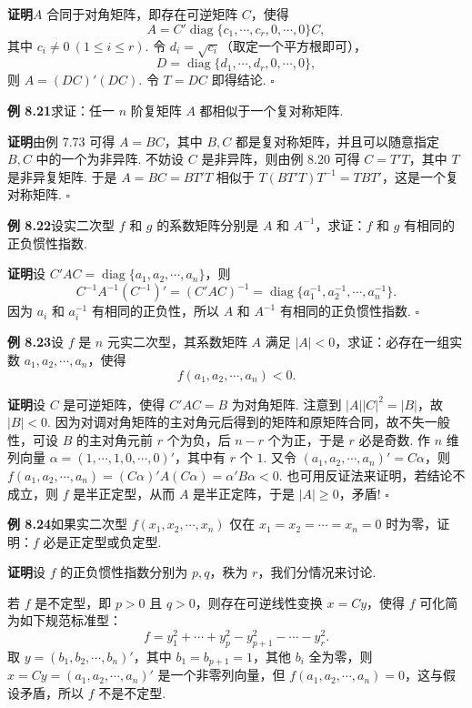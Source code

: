 \documentclass[UTF8,12pt,a4paper,fontset=fandol]{ctexart}
\begin{document}
\noindent\textbf{证明}\quad $A$ 合同于对角矩阵，即存在可逆矩阵 $C$，使得
\[
A=C'\operatorname{diag}\{c_1,\cdots,c_r,0,\cdots,0\}C,
\]
其中 $c_i\ne 0\ (1\le i\le r)$. 令 $d_i=\sqrt{c_i}$（取定一个平方根即可），
\[
D=\operatorname{diag}\{d_1,\cdots,d_r,0,\cdots,0\},
\]
则 $A=(DC)'(DC)$. 令 $T=DC$ 即得结论. $\ensuremath{\square}$

\noindent\textbf{例 8.21}\quad 求证：任一 $n$ 阶复矩阵 $A$ 都相似于一个复对称矩阵.

\noindent\textbf{证明}\quad 由例 7.73 可得 $A=BC$，其中 $B,C$ 都是复对称矩阵，并且可以随意指定 $B,C$ 中的一个为非异阵. 不妨设 $C$ 是非异阵，则由例 8.20 可得 $C=T'T$，其中 $T$ 是非异复矩阵. 于是 $A=BC=BT'T$ 相似于 $T(BT'T)T^{-1}=TBT'$，这是一个复对称矩阵. $\ensuremath{\square}$

\noindent\textbf{例 8.22}\quad 设实二次型 $f$ 和 $g$ 的系数矩阵分别是 $A$ 和 $A^{-1}$，求证：$f$ 和 $g$ 有相同的正负惯性指数.

\noindent\textbf{证明}\quad 设 $C'AC=\operatorname{diag}\{a_1,a_2,\cdots,a_n\}$，则
\[
C^{-1}A^{-1}(C^{-1})'=(C'AC)^{-1}=\operatorname{diag}\{a_1^{-1},a_2^{-1},\cdots,a_n^{-1}\}.
\]
因为 $a_i$ 和 $a_i^{-1}$ 有相同的正负性，所以 $A$ 和 $A^{-1}$ 有相同的正负惯性指数. $\ensuremath{\square}$

\noindent\textbf{例 8.23}\quad 设 $f$ 是 $n$ 元实二次型，其系数矩阵 $A$ 满足 $|A|<0$，求证：必存在一组实数 $a_1,a_2,\cdots,a_n$，使得
\[
f(a_1,a_2,\cdots,a_n)<0.
\]

\noindent\textbf{证明}\quad 设 $C$ 是可逆矩阵，使得 $C'AC=B$ 为对角矩阵. 注意到 $|A||C|^2=|B|$，故 $|B|<0$. 因为对调对角矩阵的主对角元后得到的矩阵和原矩阵合同，故不失一般性，可设 $B$ 的主对角元前 $r$ 个为负，后 $n-r$ 个为正，于是 $r$ 必是奇数. 作 $n$ 维列向量 $\alpha=(1,\cdots,1,0,\cdots,0)'$，其中有 $r$ 个 $1$. 又令 $(a_1,a_2,\cdots,a_n)'=C\alpha$，则 $f(a_1,a_2,\cdots,a_n)=(C\alpha)'A(C\alpha)=\alpha'B\alpha<0$. 也可用反证法来证明，若结论不成立，则 $f$ 是半正定型，从而 $A$ 是半正定阵，于是 $|A|\ge 0$，矛盾! $\ensuremath{\square}$

\noindent\textbf{例 8.24}\quad 如果实二次型 $f(x_1,x_2,\cdots,x_n)$ 仅在 $x_1=x_2=\cdots=x_n=0$ 时为零，证明：$f$ 必是正定型或负定型.

\noindent\textbf{证明}\quad 设 $f$ 的正负惯性指数分别为 $p,q$，秩为 $r$，我们分情况来讨论.

若 $f$ 是不定型，即 $p>0$ 且 $q>0$，则存在可逆线性变换 $x=Cy$，使得 $f$ 可化简为如下规范标准型：
\[
f=y_1^2+\cdots+y_p^2-y_{p+1}^2-\cdots-y_r^2.
\]
取 $y=(b_1,b_2,\cdots,b_n)'$，其中 $b_1=b_{p+1}=1$，其他 $b_i$ 全为零，则 $x=Cy=(a_1,a_2,\cdots,a_n)'$ 是一个非零列向量，但 $f(a_1,a_2,\cdots,a_n)=0$，这与假设矛盾，所以 $f$ 不是不定型.
\end{document}
